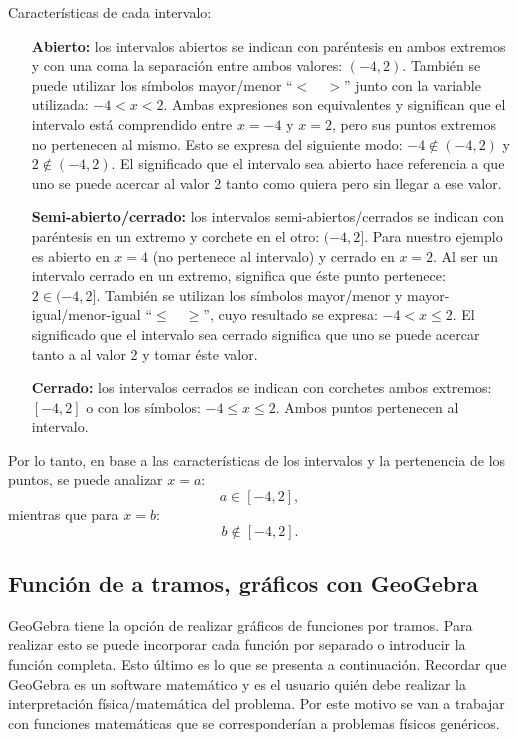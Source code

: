 Características de cada intervalo:
\begin{enumerate}
  \item[\bf Abierto:] los intervalos abiertos se indican con paréntesis en ambos
    extremos y con una coma la separación entre ambos valores: $(-4,2)$. También
    se puede utilizar los símbolos mayor/menor ``$< \quad >$'' junto con la
    variable utilizada: $-4 < x < 2$. Ambas expresiones son equivalentes y
    significan que el intervalo está comprendido entre $x=-4$ y $x=2$, pero sus
    puntos extremos no pertenecen al mismo. Esto se expresa del siguiente modo:
    $-4\notin (-4,2)$ y $2\notin (-4,2)$. El significado que el intervalo sea
    abierto hace referencia a que uno se puede acercar al valor 2 tanto como
    quiera pero sin llegar a ese valor.
  \item[\bf Semi-abierto/cerrado:] los intervalos semi-abiertos/cerrados se
    indican con paréntesis en un extremo y corchete en el otro: $(-4,2]$. Para
    nuestro ejemplo es abierto en $x=4$ (no pertenece al intervalo) y cerrado en
    $x=2$. Al ser un intervalo cerrado en un extremo, significa que éste punto
    pertenece: $2 \in (-4,2]$. También se utilizan los símbolos mayor/menor y
    mayor-igual/menor-igual ``$\le \quad \ge$'', cuyo resultado se expresa:
    \mbox{$-4<x\le2$}. El significado que el intervalo sea cerrado significa que
    uno se puede acercar tanto a al valor 2 y tomar éste valor.
  \item[\bf Cerrado:] los intervalos cerrados se indican con corchetes ambos
    extremos: $[-4,2]$ o con los símbolos: $-4\le x \le 2$. Ambos puntos
    pertenecen al intervalo.
\end{enumerate}

Por lo tanto, en base a las características de los intervalos y la pertenencia
de los puntos, se puede analizar $x=a$:
$$
a \in [-4,2],
$$
mientras que para $x=b$:
$$
b \notin [-4,2].
$$

\clearpage
\subsection{Función de a tramos, gráficos con GeoGebra}
\label{c.geogebra}

GeoGebra tiene la opción de realizar gráficos de funciones por tramos. Para
realizar esto se puede incorporar cada función por separado o introducir la
función completa. Esto último es lo que se presenta a continuación. Recordar que
GeoGebra es un software matemático y es el usuario quién debe realizar la
interpretación física/matemática del problema. Por este motivo se van a trabajar
con funciones matemáticas que se corresponderían a problemas físicos genéricos.

